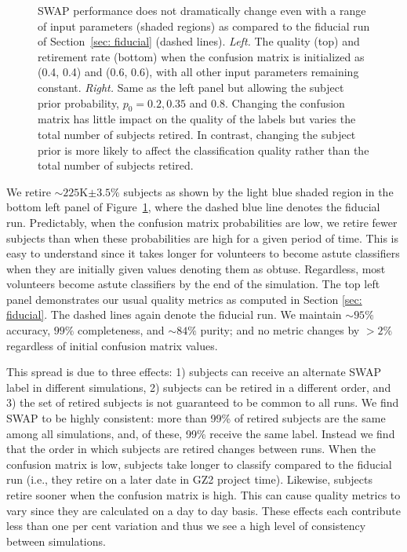\documentclass[twocolumn,  trackchanges,]{aastex6}%
\newcommand{\p}{$p_0$}
\begin{document}
\begin{figure}[t]
\caption{SWAP performance does not dramatically change even with a range of input parameters (shaded regions) as compared to the fiducial run of Section~\ref{sec: fiducial} (dashed lines).  \textit{Left.} The quality (top) and retirement rate (bottom) when the confusion matrix is initialized as (0.4, 0.4) and (0.6, 0.6), with all other input parameters remaining constant. \textit{Right.} Same as the left panel but allowing the subject prior probability, \p $= 0.2, 0.35$ and $0.8$. Changing the confusion matrix has little impact on the quality of the labels but varies the total number of subjects retired. In contrast, changing the subject prior is more likely to affect the classification quality rather than the total number of subjects retired. \label{fig: tweak swap}}
\end{figure}

We retire $\sim$$225$K$\pm3.5\%$ subjects as shown by the light blue shaded region in the bottom
left panel of Figure~\ref{fig: tweak swap}, where the dashed blue line denotes the fiducial run. 
Predictably, when the confusion matrix probabilities are low, we retire fewer subjects 
than when these probabilities are high for a given period of time. 
This is easy to understand since it takes longer for volunteers to become astute 
classifiers when they are initially given values denoting them as obtuse. 
Regardless, most volunteers become astute classifiers by the end of the simulation. 
The top left panel demonstrates our usual quality metrics as computed in Section \ref{sec: fiducial}.
The dashed lines again denote the fiducial run. 
We maintain $\sim$$95\%$ accuracy, $99\%$ completeness, and $\sim$$84\%$ purity;
 and no metric changes by $> 2\%$ regardless of initial confusion matrix values.  
 
This spread is due to three effects: 
1) subjects can receive an alternate SWAP label in different simulations, 
2) subjects can be retired in a different order, and 
3) the set of retired subjects is not guaranteed to be common to all runs. 
We find SWAP to be highly consistent: 
more than 99\% of retired subjects are the same among all simulations, 
and, of these, 99\% receive the same label.  Instead we find that the order in which 
subjects are retired changes between runs. 
When the confusion matrix is low, subjects take longer to classify compared to the fiducial run 
(i.e., they retire on a later date in GZ2 project time). 
Likewise, subjects retire sooner when the confusion matrix is high. 
This can cause quality metrics to vary since they are calculated on a day to day basis. 
These effects each contribute less than one per cent variation and thus we see a 
high level of consistency between simulations. 
\end{document}
